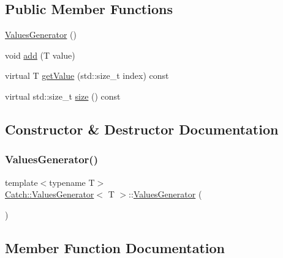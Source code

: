 \subsection*{Public Member Functions}
\begin{DoxyCompactItemize}
\item 
\hyperlink{class_catch_1_1_values_generator_a36cd3d75afb1f5502400c3ad7cae7a5e}{Values\+Generator} ()
\item 
void \hyperlink{class_catch_1_1_values_generator_a8412c8ce5d9d4fc6ff06d5246d56d538}{add} (T value)
\item 
virtual T \hyperlink{class_catch_1_1_values_generator_a9674c8b70d562d2d68154de92dd1810a}{get\+Value} (std\+::size\+\_\+t index) const
\item 
virtual std\+::size\+\_\+t \hyperlink{class_catch_1_1_values_generator_a9aa5b140ee502975cf35115e534ab771}{size} () const
\end{DoxyCompactItemize}


\subsection{Constructor \& Destructor Documentation}
\hypertarget{class_catch_1_1_values_generator_a36cd3d75afb1f5502400c3ad7cae7a5e}{}\label{class_catch_1_1_values_generator_a36cd3d75afb1f5502400c3ad7cae7a5e} 
\subsubsection{\texorpdfstring{Values\+Generator()}{ValuesGenerator()}}
{\footnotesize\ttfamily template$<$typename T$>$ \\
\hyperlink{class_catch_1_1_values_generator}{Catch\+::\+Values\+Generator}$<$ T $>$\+::\hyperlink{class_catch_1_1_values_generator}{Values\+Generator} (\begin{DoxyParamCaption}{ }\end{DoxyParamCaption})\hspace{0.3cm}{\ttfamily [inline]}}



\subsection{Member Function Documentation}
\hypertarget{class_catch_1_1_values_generator_a8412c8ce5d9d4fc6ff06d5246d56d538}{}\label{class_catch_1_1_values_generator_a8412c8ce5d9d4fc6ff06d5246d56d538} 
